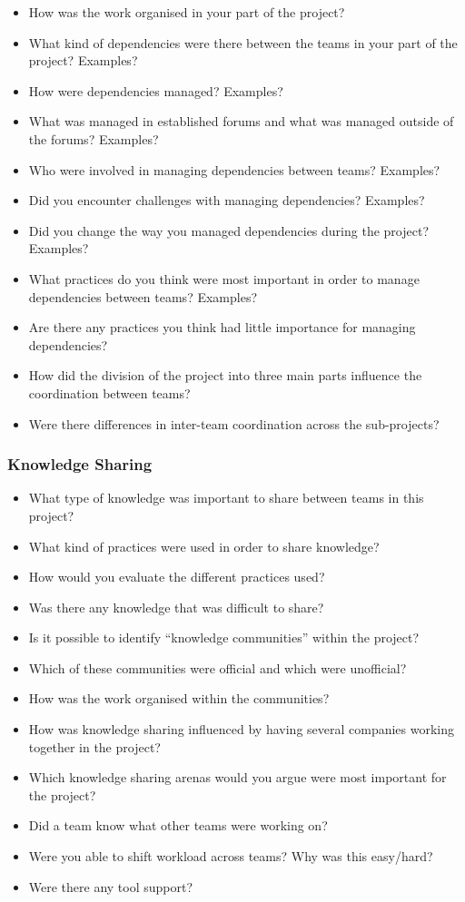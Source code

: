\begin{itemize}
	\item How was the work organised in your part of the project?
	\item What kind of dependencies were there between the teams in your part of the project? Examples?
	\item How were dependencies managed? Examples?
	\item What was managed in established forums and what was managed outside of the forums? Examples?
	\item Who were involved in managing dependencies between teams? Examples?
	\item Did you encounter challenges with managing dependencies? Examples?
	\item Did you change the way you managed dependencies during the project? Examples?
	\item What practices do you think were most important in order to manage dependencies between teams? Examples?
	\item Are there any practices you think had little importance for managing dependencies?
	\item How did the division of the project into three main parts influence the coordination between teams?
	\item Were there differences in inter-team coordination across the sub-projects?
\end{itemize}

\subsubsection{Knowledge Sharing}

\begin{itemize}
	\item What type of knowledge was important to share between teams in this project?
	\item What kind of practices were used in order to share knowledge?
	\item How would you evaluate the different practices used?
	\item Was there any knowledge that was difficult to share?
	\item Is it possible to identify ``knowledge communities'' within the project?
	\item Which of these communities were official and which were unofficial?
	\item How was the work organised within the communities?
	\item How was knowledge sharing influenced by having several companies working together in the project?
	\item Which knowledge sharing arenas would you argue were most important for the project?
	\item Did a team know what other teams were working on?
	\item Were you able to shift workload across teams? Why was this easy/hard?
	\item Were there any tool support?
\end{itemize}

